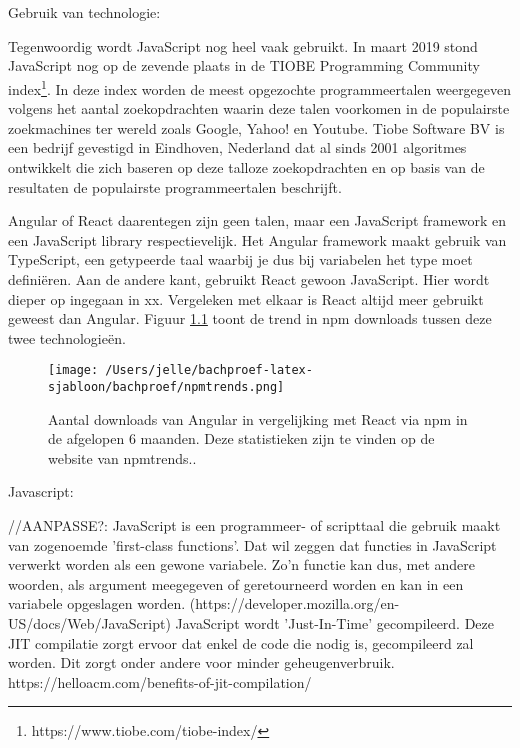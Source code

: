 \chapter{}
\label{ch:stand-van-zaken}



Gebruik van technologie:

Tegenwoordig wordt JavaScript nog heel vaak gebruikt. In maart 2019 stond JavaScript nog op de zevende plaats in de TIOBE Programming Community index\footnote{https://www.tiobe.com/tiobe-index/}. In deze index worden de meest opgezochte programmeertalen weergegeven volgens het aantal zoekopdrachten waarin deze talen voorkomen in de populairste zoekmachines ter wereld zoals Google, Yahoo! en Youtube. Tiobe Software BV is een bedrijf gevestigd in Eindhoven, Nederland dat al sinds 2001 algoritmes ontwikkelt die zich baseren op deze talloze zoekopdrachten en op basis van de resultaten de populairste programmeertalen beschrijft. \autocite{Redondo2017}

Angular of React daarentegen zijn geen talen, maar een JavaScript framework en een JavaScript library respectievelijk. Het Angular framework maakt gebruik van TypeScript, een getypeerde taal waarbij je dus bij variabelen het type moet definiëren. Aan de andere kant, gebruikt React gewoon JavaScript. Hier wordt dieper op ingegaan in xx. Vergeleken met elkaar is React altijd meer gebruikt geweest dan Angular. Figuur \ref{fig:a} toont de trend in npm downloads tussen deze twee technologieën. \autocite{Hamedani2018}
	\begin{figure}
		\centering
		\texttt{[image: /Users/jelle/bachproef-latex-sjabloon/bachproef/npmtrends.png]}
		\caption{Aantal downloads van Angular in vergelijking met React via npm in de afgelopen 6 maanden. Deze statistieken zijn te vinden op de website van npmtrends.\protect\footnotemark. }
		\label{fig:a}
	\end{figure}

Javascript:

//AANPASSE?: JavaScript is een programmeer- of scripttaal die gebruik maakt van zogenoemde 'first-class functions'. Dat wil zeggen dat functies in JavaScript verwerkt worden als een gewone variabele. Zo'n functie kan dus, met andere woorden, als argument meegegeven of geretourneerd worden en kan in een variabele opgeslagen worden. (https://developer.mozilla.org/en-US/docs/Web/JavaScript) JavaScript wordt 'Just-In-Time' gecompileerd. Deze JIT compilatie zorgt ervoor dat enkel de code die nodig is, gecompileerd zal worden. Dit zorgt onder andere voor minder geheugenverbruik. https://helloacm.com/benefits-of-jit-compilation/

